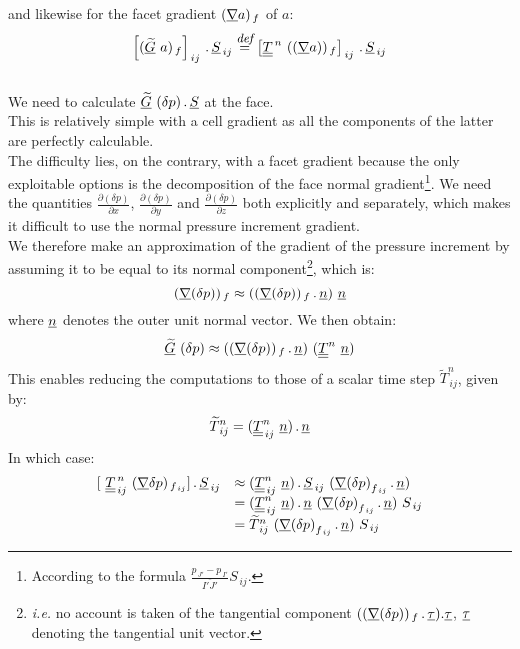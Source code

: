 and likewise for the facet gradient $(\underline{\nabla}{a})_{\,f}$ of $a$:
$$ \left[(\vect{\widetilde{G}}\ a )_{\,f}\right]_{\,ij}\,.\,\vect{S}_{\,ij} \overset{\text{\it\small def}}{=} \left[\tens{T}^{\,n}\ ((\grad{a}))_{\,f}\right]_{\,ij}\,.\,\vect{S}_{\,ij} $$
\\

We need to calculate $\vect{\widetilde{G}}\ (\delta p)\,.\,\vect{S}$ at the face.\\
This is relatively simple with a cell gradient as all the components of the latter are perfectly calculable.\\
The difficulty lies, on the contrary, with a facet gradient because the only exploitable options is the decomposition of the face normal gradient\footnote{According to the formula $ \displaystyle\frac { p_{\,J'} - p_{\,I'}}{\overline{I'J'}} S_{\,ij}$.}. We need the quantities $\displaystyle \frac{\partial (\delta p)}{\partial x}$, $\displaystyle \frac{\partial (\delta p)}{\partial y}$ and $\displaystyle \frac{\partial (\delta p)}{\partial z}$ both explicitly and separately, which makes it difficult to use the normal pressure increment gradient.\\
We therefore make an approximation of the gradient of the pressure increment by assuming it to be equal to its normal component\footnote{{\it i.e.} no account is taken of the tangential component $((\underline{\nabla}{(\delta p)})_{\,f}\,.\,\underline{\tau}).\underline{\tau}$, $\underline{\tau}$ denoting the tangential unit vector.}, which is:
\begin{equation}
(\underline{\nabla}{(\delta p)})_{\,f} \approx ((\underline{\nabla}{(\delta p)})_{\,f}\,.\,\underline{n})\ \underline{n}
\end{equation}
where $\underline{n}$ denotes the outer unit normal vector.
We then obtain:
$$ \vect{\widetilde{G}}\ (\delta p) \approx ((\grad{(\delta p)})_{\,f}\,.\,\vect{n})\ (\tens{T}^n\ \vect{n})$$
This enables reducing the computations to those of a scalar time step $\widetilde{T}^n_{\,ij}$, given by:
\begin{equation}
\widetilde{T}^n_{\,ij} = (\underline{\underline{T}}^n_{\,ij}\ \underline{n})\,.\,\underline{n}
\label{Base_Resopv_approx2}
\end{equation}
In which case:
\begin{equation}
\begin{array} {lll}
[\ \tens{T}^{\,n}_{\,ij}\ (\grad{\delta p})_{\,f_{\,ij}}]\,.\,\vect{S}_{\,ij}& \approx (\tens{T}^n_{\,ij}\ \vect{n})\,.\,\vect{S}_{\,ij}\ (\grad{(\delta p)}_{f_{\,ij}}\,.\,\vect{n}) \\
 & =  (\tens{T}^n_{\,ij}\ \vect{n})\,.\,\vect{n} \ ({\grad{(\delta p)}}_{f_{\,ij}}\,.\,\vect{n}) \ S_{\,ij} \\
 & =  \widetilde{T}^n_{\,ij} \ ({\grad{(\delta p)}}_{f_{\,ij}}\,.\,\vect{n}) \ S_{\,ij}
 \end{array}
\label{Base_Resopv_approximation}
\end{equation}

